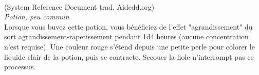 \\
{\small (System Reference Document trad. Aidedd.org)}\\
{\small \it Potion, peu commun}\\
Lorsque vous buvez cette potion, vous bénéficiez de l'effet "agrandissement" du sort agrandissement-rapetissement pendant 1d4 heures (aucune concentration n'est requise). Une couleur rouge s'étend depuis une petite perle pour colorer le liquide clair de la potion, puis se contracte. Secouer la fiole n'interrompt pas ce processus. \\

